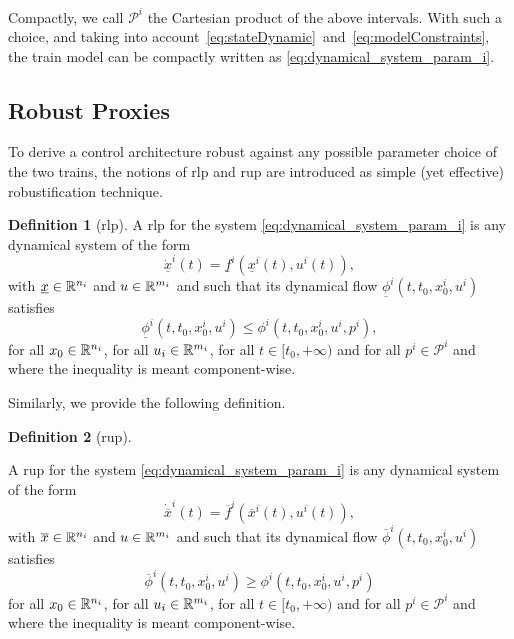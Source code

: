 \documentclass[letterpaper, 10 pt, conference]{ieeeconf}
\newcounter{Definition}
\theoremstyle{definition}
\theoremstyle{nopoint}
\newtheorem{definitionNoPoint}{Definition}
\begin{document}
Compactly, we call $\mathcal{P}^i$ the Cartesian product of the above intervals.  With such a choice, and taking into account~\eqref{eq:stateDynamic}~and~\eqref{eq:modelConstraints}, the train model can be compactly  written as \eqref{eq:dynamical_system_param_i}.






\subsection{Robust Proxies}
\label{subsec:robustProxies}
%
To derive a control architecture robust against any possible parameter choice of the two trains, 
the notions of \gls{rlp} and \gls{rup} are  introduced as simple (yet effective) robustification technique. 
%
\begin{definitionNoPoint}[\gls{rlp}]\label{def:rlp}
A \gls{rlp} for the system \eqref{eq:dynamical_system_param_i} is any dynamical system of the form
%
\begin{equation} \label{eq:rlp}
     \underline{\dot{x}}^i(t) = \underline{f}^i(\underline{x}^i(t),u^i(t)),
\end{equation}
with $\underline{x}\in \Bbb{R}^{n_i}$ and $u\in\Bbb{R}^{m_i}$ and such that its dynamical flow $\underline{\phi}^i\left(t,t_0,x_0^i,u^i\right)$ satisfies 
\begin{equation}\label{lemma:rlpProxy}
\underline{\phi}^i\left(t,t_0,x_0^i,u^i\right) \leq \phi^i\left(t,t_0,x_0^i,u^i,p^i\right), 
\end{equation}
for all $x_0\in\Bbb{R}^{n_i}$, for all $u_i \in \Bbb{R}^{m_i}$, for all $t\in [t_0, +\infty)$ and for all $p^i\in\mathcal{P}^i$ and where the inequality is meant component-wise.
\end{definitionNoPoint}

Similarly, we provide the following definition. 

\begin{definitionNoPoint}[\gls{rup}]\label{def:rup}
	
A \gls{rup} for the system \eqref{eq:dynamical_system_param_i} is any dynamical system of the form
\begin{equation} \label{eq:rup}
     \dot{\overline{x}}^i(t) = \overline{f}^i(\overline{x}^i(t),u^i(t)),
\end{equation}
with $\overline{x}\in \Bbb{R}^{n_i}$ and $u\in\Bbb{R}^{m_i}$ and such that its dynamical flow $\overline{\phi}^i\left(t,t_0,x_0^i,u^i\right)$ satisfies 
\begin{equation}\label{lemma:rupProxy}
\overline{\phi}^i\left(t,t_0,x_0^i,u^i\right) \geq \phi^i\left(t,t_0,x_0^i,u^i,p^i\right)
\end{equation}
for all $x_0\in\Bbb{R}^{n_i}$, for all $u_i \in \Bbb{R}^{m_i}$, for all $t\in [t_0, +\infty)$ and for all $p^i\in\mathcal{P}^i$  and where the inequality is meant component-wise.
\end{definitionNoPoint}
\end{document}
